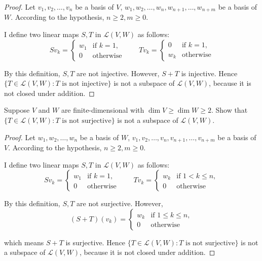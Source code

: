 \begin{proof}
    Let $v_{1}, v_{2}, \ldots, v_{n}$ be a basis of $V$, $w_{1}, w_{2}, \ldots, w_{n}, w_{n+1}, \ldots, w_{n+m}$ be a basis of $W$. According to the hypothesis, $n\geq 2, m\geq 0$.

    I define two linear maps $S, T$ in $\mathcal{L}(V, W)$ as follows:
    \[
        Sv_{k} = \begin{cases}
            w_{1} & \text{if $k = 1$}, \\
            0     & \text{otherwise}
        \end{cases}
        \qquad
        Tv_{k} = \begin{cases}
            0     & \text{if $k = 1$}, \\
            w_{k} & \text{otherwise}
        \end{cases}
    \]

    By this definition, $S, T$ are not injective. However, $S + T$ is injective. Hence $\{T \in \mathcal{L}(V, W) : T \text{ is not injective} \}$ is not a subspace of $\mathcal{L}(V, W)$, because it is not closed under addition.
\end{proof}
\newpage

\begin{exercise}
    Suppose $V$ and $W$ are finite-dimensional with $\dim V \geq \dim W \geq 2$. Show
    that $\{T \in \mathcal{L}(V, W) : T \text{ is not surjective}\}$ is not a subspace of $\mathcal{L}(V, W)$.
\end{exercise}

\begin{proof}
    Let $w_{1}, w_{2}, \ldots, w_{n}$ be a basis of $W$, $v_{1}, v_{2}, \ldots, v_{n}, v_{n+1}, \ldots, v_{n+m}$ be a basis of $V$. According to the hypothesis, $n\geq 2, m\geq 0$.

    I define two linear maps $S, T$ in $\mathcal{L}(V, W)$ as follows:
    \[
        Sv_{k} = \begin{cases}
            w_{1} & \text{if $k = 1$}, \\
            0     & \text{otherwise}
        \end{cases}
        \qquad
        Tv_{k} = \begin{cases}
            w_{k} & \text{if $1 < k\leq n$}, \\
            0     & \text{otherwise}
        \end{cases}
    \]

    By this definition, $S, T$ are not surjective. However,
    \[
        (S+T)(v_{k}) = \begin{cases}
            w_{k} & \text{if $1\leq k\leq n$}, \\
            0     & \text{otherwise}
        \end{cases}
    \]

    which means $S + T$ is surjective. Hence $\{T \in \mathcal{L}(V, W) : T \text{ is not surjective} \}$ is not a subspace of $\mathcal{L}(V, W)$, because it is not closed under addition.
\end{proof}
\newpage

